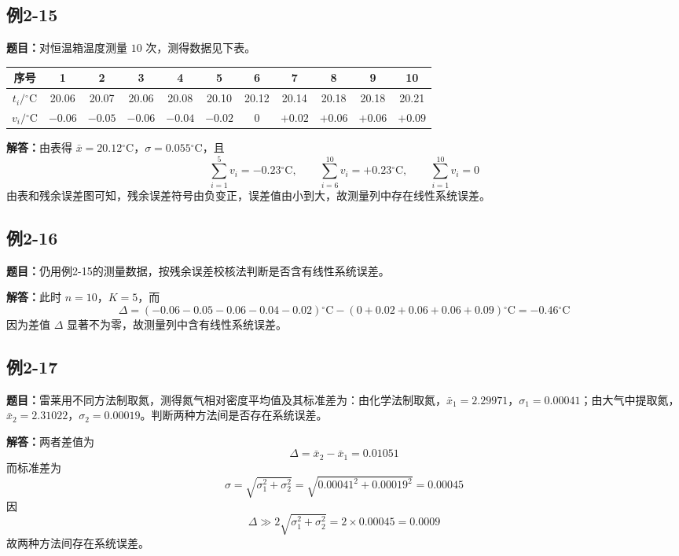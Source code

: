 \documentclass[UTF8,zihao=-4]{ctexart}
\newcommand{\problem}[1]{\subsection*{#1}}
\newcommand{\timu}{\noindent\textbf{题目：}}
\newcommand{\jieda}{\noindent\textbf{解答：}}
\begin{document}
\problem{例2-15}
\timu 对恒温箱温度测量 $10$ 次，测得数据见下表。

\begin{center}
\scriptsize
\setlength{\tabcolsep}{8pt}
\begin{tabular}{c|cccccccccc}
\toprule
序号 & 1 & 2 & 3 & 4 & 5 & 6 & 7 & 8 & 9 & 10\\
\midrule
$t_i/{}^\circ\mathrm{C}$ & 20.06 & 20.07 & 20.06 & 20.08 & 20.10 & 20.12 & 20.14 & 20.18 & 20.18 & 20.21\\
$v_i/{}^\circ\mathrm{C}$ & $-0.06$ & $-0.05$ & $-0.06$ & $-0.04$ & $-0.02$ & 0 & $+0.02$ & $+0.06$ & $+0.06$ & $+0.09$\\
\bottomrule
\end{tabular}
\end{center}

\jieda 由表得 $\bar{x}=20.12{}^\circ\mathrm{C}$，$\sigma=0.055{}^\circ\mathrm{C}$，且
\begin{equation*}
    \sum_{i=1}^{5}v_i=-0.23{}^\circ\mathrm{C},\qquad
    \sum_{i=6}^{10}v_i=+0.23{}^\circ\mathrm{C},\qquad
    \sum_{i=1}^{10}v_i=0
\end{equation*}
由表和残余误差图可知，残余误差符号由负变正，误差值由小到大，故测量列中存在线性系统误差。

\problem{例2-16}
\timu 仍用例2-15的测量数据，按残余误差校核法判断是否含有线性系统误差。

\jieda 此时 $n=10$，$K=5$，而
\begin{equation*}
    \Delta=(-0.06-0.05-0.06-0.04-0.02){}^\circ\mathrm{C}
    -(0+0.02+0.06+0.06+0.09){}^\circ\mathrm{C}
    =-0.46{}^\circ\mathrm{C}
\end{equation*}
因为差值 $\Delta$ 显著不为零，故测量列中含有线性系统误差。

\problem{例2-17}
\timu 雷莱用不同方法制取氮，测得氮气相对密度平均值及其标准差为：由化学法制取氮，$\bar{x}_1=2.29971$，$\sigma_1=0.00041$；由大气中提取氮，$\bar{x}_2=2.31022$，$\sigma_2=0.00019$。判断两种方法间是否存在系统误差。

\jieda 两者差值为
\begin{equation*}
    \Delta=\bar{x}_2-\bar{x}_1=0.01051
\end{equation*}
而标准差为
\begin{equation*}
    \sigma=\sqrt{\sigma_1^2+\sigma_2^2}
    =\sqrt{0.00041^2+0.00019^2}=0.00045
\end{equation*}
因
\begin{equation*}
    \Delta\gg2\sqrt{\sigma_1^2+\sigma_2^2}=2\times0.00045=0.0009
\end{equation*}
故两种方法间存在系统误差。
\end{document}

